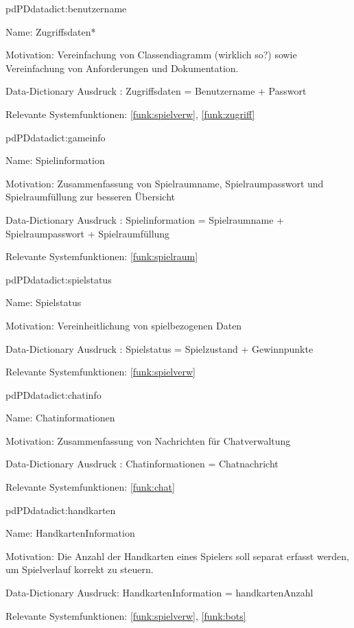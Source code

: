 \begin{description}[leftmargin=5em, style=sameline]
\begin{lhp}{pd}{PD}{datadict:benutzername}
\item [Name:] Zugriffsdaten*
\item [Motivation:] Vereinfachung von Classendiagramm (wirklich so?) sowie Vereinfachung von Anforderungen und Dokumentation.
\item [Data-Dictionary Ausdruck]: Zugriffsdaten = Benutzername + Passwort
\item [Relevante Systemfunktionen:]  \ref{funk:spielverw}, \ref{funk:zugriff}
\end{lhp}

\begin{lhp}{pd}{PD}{datadict:gameinfo}
    \item [Name:] Spielinformation
    \item [Motivation:] Zusammenfassung von Spielraumname, Spielraumpasswort und Spielraumfüllung zur besseren Übersicht
    \item [Data-Dictionary Ausdruck]: Spielinformation = Spielraumname + Spielraumpasswort + Spielraumfüllung
    \item [Relevante Systemfunktionen:]  \ref{funk:spielraum}
\end{lhp}

\begin{lhp}{pd}{PD}{datadict:spielstatus}
    \item [Name:] Spielstatus
    \item [Motivation:] Vereinheitlichung von spielbezogenen Daten
    \item [Data-Dictionary Ausdruck]: Spielstatus = Spielzustand + Gewinnpunkte
    \item [Relevante Systemfunktionen:]  \ref{funk:spielverw}
\end{lhp}

\begin{lhp}{pd}{PD}{datadict:chatinfo}
    \item [Name:] Chatinformationen
    \item [Motivation:] Zusammenfassung von Nachrichten für Chatverwaltung
    \item [Data-Dictionary Ausdruck]: Chatinformationen = Chatnachricht
    \item [Relevante Systemfunktionen:]  \ref{funk:chat}
\end{lhp}

\begin{lhp}{pd}{PD}{datadict:handkarten}
    \item [Name:] HandkartenInformation
    \item [Motivation:] Die Anzahl der Handkarten eines Spielers soll separat erfasst werden, um Spielverlauf korrekt zu steuern.
    \item [Data-Dictionary Ausdruck:] HandkartenInformation = handkartenAnzahl
    \item [Relevante Systemfunktionen:] \ref{funk:spielverw}, \ref{funk:bots}
\end{lhp}


\end{description}
